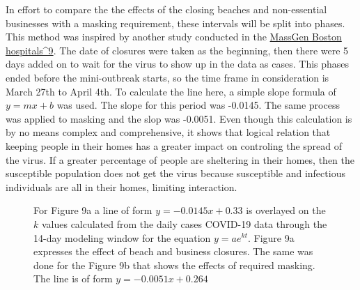 \documentclass[12pt]{article}
\begin{document}
In effort to compare the the effects of the closing beaches and non-essential businesses with a masking requirement, these intervals will be split into phases. This method was inspired by another study conducted in the \href{https://jamanetwork.com/journals/jama/fullarticle/2768533}{MassGen Boston hospitals^9}. The date of closures were taken as the beginning, then there were 5 days added on to wait for the virus to show up in the data as cases. This phases ended before the mini-outbreak starts, so the time frame in consideration is March 27th to April 4th. To calculate the line here, a simple slope formula of $y = mx + b$ was used. The slope for this period was -0.0145. The same process was applied to masking and the slop was -0.0051. Even though this calculation is by no means complex and comprehensive, it shows that logical relation that keeping people in their homes has a greater impact on controling the spread of the virus. If a greater percentage of people are sheltering in their homes, then the susceptible population does not get the virus because susceptible and infectious individuals are all in their homes, limiting interaction.

\begin{figure}[h]
  \centering
  \hfill
  \caption{For Figure 9a a line of form $y = -0.0145x+0.33$ is overlayed on the $k$ values calculated from the daily cases COVID-19 data through the 14-day modeling window for the equation $y=ae^{kt}$. Figure 9a expresses the effect of beach and business closures. The same was done for the Figure 9b that shows the effects of required masking. The line is of form $y=-0.0051x+0.264$}
  \label{fig:9}
\end{figure}
\end{document}
